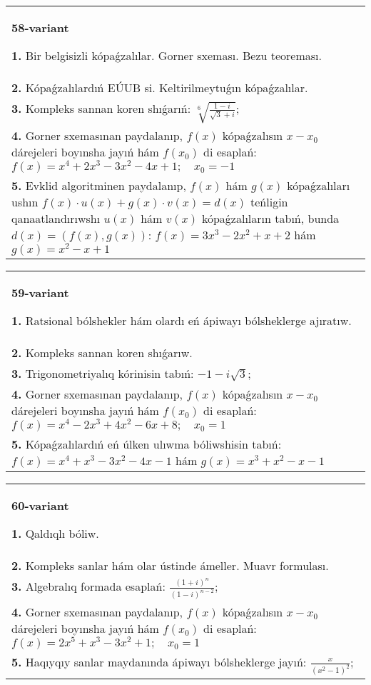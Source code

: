 \documentclass{article}
\begin{document}
\begin{tabular}{m{17cm}}
\textbf{58-variant}
\newline

\textbf{1.} Bir belgisizli kópaǵzalılar. Gorner sxeması. Bezu teoreması.  \\
\textbf{2.} Kópaǵzalılardıń EÚUB si. Keltirilmeytuǵın   kópaǵzalılar. \\
\textbf{3.} Kompleks sannan koren shıǵarıń: $\sqrt[6]{\frac{1-i}{\sqrt{3}+i}}$; \\
\textbf{4.} Gorner sxemasınan paydalanıp, $f(x)$ kópaǵzalısın $x-x_0$ dárejeleri boyınsha jayıń hám $f\left(x_0\right)$ di esaplań: $f(x)=x^4+2 x^3-3 x^2-4 x+1 ; \quad x_0=-1$ \\
\textbf{5.} Evklid algoritminen paydalanıp, $f(x)$ hám $g(x)$ kópaǵzalıları ushın $f(x) \cdot u(x)+g(x) \cdot v(x)=d(x)$ teńligin qanaatlandırıwshı $u(x)$ hám $v(x)$ kópaǵzalıların tabıń, bunda $d(x)=(f(x), g(x))$:  $f(x)=3 x^3-2 x^2+x+2$ hám $g(x)=x^2-x+1$ \\

\end{tabular}
\vspace{1cm}


\begin{tabular}{m{17cm}}
\textbf{59-variant}
\newline

\textbf{1.} Ratsional bólshekler hám olardı eń ápiwayı bólsheklerge ajıratıw. \\
\textbf{2.} Kompleks sannan koren shıǵarıw. \\
\textbf{3.} Trigonometriyalıq kórinisin tabıń: $-1-i \sqrt{3}$; \\
\textbf{4.} Gorner sxemasınan paydalanıp, $f(x)$ kópaǵzalısın $x-x_0$ dárejeleri boyınsha jayıń hám $f\left(x_0\right)$ di esaplań: $f(x)=x^4-2 x^3+4 x^2-6 x+8 ; \quad x_0=1$ \\
\textbf{5.} Kópaǵzalılardıń eń úlken ulıwma bóliwshisin tabıń:  $f(x)=x^4+x^3-3 x^2-4 x-1$ hám $g(x)=x^3+x^2-x-1$ \\

\end{tabular}
\vspace{1cm}


\begin{tabular}{m{17cm}}
\textbf{60-variant}
\newline

\textbf{1.} Qaldıqlı bóliw.  \\
\textbf{2.} Kompleks sanlar hám olar ústinde ámeller. Muavr formulası.  \\
\textbf{3.} Algebralıq formada esaplań: $\frac{(1+i)^n}{(1-i)^{n-2}}$; \\
\textbf{4.} Gorner sxemasınan paydalanıp, $f(x)$ kópaǵzalısın $x-x_0$ dárejeleri boyınsha jayıń hám $f\left(x_0\right)$ di esaplań:  $f(x)=2 x^5+x^3-3 x^2+1 ; \quad x_0=1$ \\
\textbf{5.} Haqıyqıy sanlar maydanında ápiwayı bólsheklerge jayıń:  $\frac{x}{\left(x^2-1\right)^2}$; \\

\end{tabular}
\vspace{1cm}
\end{document}
